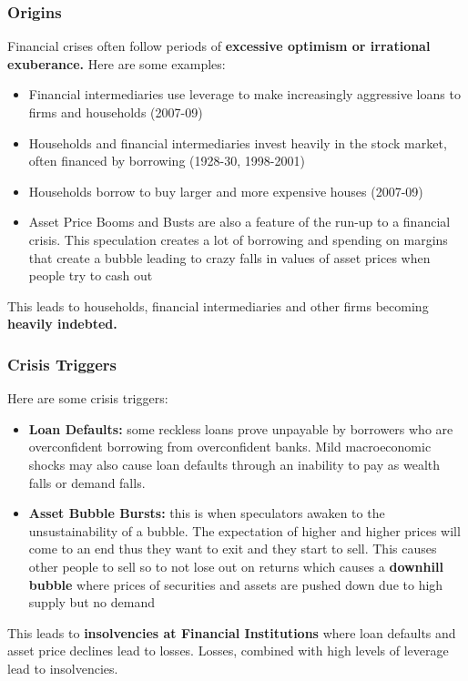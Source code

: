 \documentclass[12pt, letterpaper]{article}
\begin{document}
\subsubsection{Origins}
Financial crises often follow periods of \textbf{excessive optimism or irrational exuberance.} Here are some examples:
\begin{itemize}
	\item Financial intermediaries use leverage to make increasingly aggressive loans to firms and households (2007-09)
	\item Households and financial intermediaries invest heavily in the stock market, often financed by borrowing (1928-30, 1998-2001)
	\item Households borrow to buy larger and more expensive houses (2007-09)
	\item Asset Price Booms and Busts are also a feature of the run-up to a financial crisis. This speculation creates a lot of borrowing and spending on margins that create a bubble leading to crazy falls in values of asset prices when people try to cash out
\end{itemize}
This leads to households, financial intermediaries and other firms becoming \textbf{heavily indebted.}

\subsubsection{Crisis Triggers}
Here are some crisis triggers:
\begin{itemize}
	\item \textbf{Loan Defaults:} some reckless loans prove unpayable by borrowers who are overconfident borrowing from overconfident banks. Mild macroeconomic shocks may also cause loan defaults through an inability to pay as wealth falls or demand falls.
	\item \textbf{Asset Bubble Bursts:} this is when speculators awaken to the unsustainability of a bubble. The expectation of higher and higher prices will come to an end thus they want to exit and they start to sell. This causes other people to sell so to not lose out on returns which causes a \textbf{downhill bubble} where prices of securities and assets are pushed down due to high supply but no demand
\end{itemize}
This leads to \textbf{insolvencies at Financial Institutions} where loan defaults and asset price declines lead to losses. Losses, combined with high levels of leverage lead to insolvencies.
\end{document}
